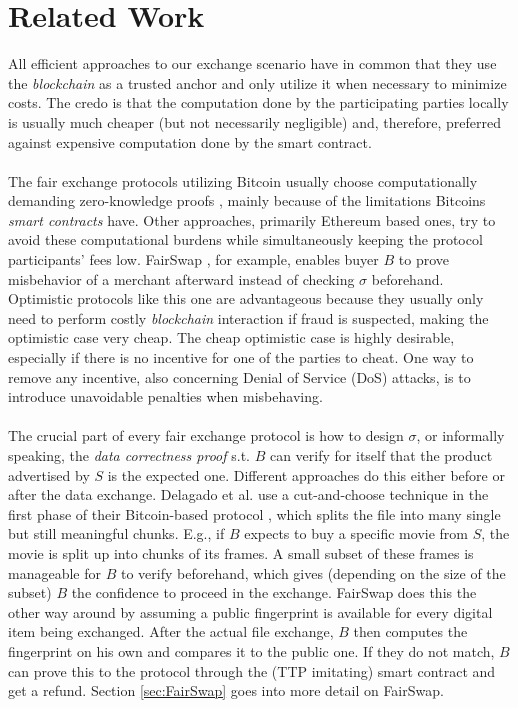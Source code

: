 \documentclass{cacthesis}
\newcounter{protocol}
\begin{document}
        \section{Related Work}
        \label{sec:relatedWork}
        All efficient approaches to our exchange scenario have in common that they use the \textit{blockchain} as a trusted anchor and only utilize it when necessary to minimize costs. The credo is that the computation done by the participating parties locally is usually much cheaper (but not necessarily negligible) and, therefore, preferred against expensive computation done by the smart contract. \\\\
        The fair exchange protocols utilizing Bitcoin usually choose computationally demanding zero-knowledge proofs \cite{zkcp}\cite{DELGADOSEGURA2020832}, mainly because of the limitations Bitcoins \textit{smart contracts} have. Other approaches, primarily Ethereum based ones, try to avoid these computational burdens while simultaneously keeping the protocol participants' fees low. FairSwap \cite{10.1145/3243734.3243857}, for example, enables buyer $B$ to prove misbehavior of a merchant afterward instead of checking $\sigma$ beforehand. Optimistic protocols like this one are advantageous because they usually only need to perform costly \textit{blockchain} interaction if fraud is suspected, making the optimistic case very cheap. The cheap optimistic case is highly desirable, especially if there is no incentive for one of the parties to cheat. One way to remove any incentive, also concerning Denial of Service (DoS) attacks, is to introduce unavoidable penalties when misbehaving. \\\\
        The crucial part of every fair exchange protocol is how to design $\sigma$, or informally speaking, the \textit{data correctness proof} s.t. $B$ can verify for itself that the product advertised by $S$ is the expected one. Different approaches do this either before or after the data exchange. Delagado et al. use a cut-and-choose technique in the first phase of their Bitcoin-based protocol \cite{DELGADOSEGURA2020832}, which splits the file into many single but still meaningful chunks. E.g., if $B$ expects to buy a specific movie from $S$, the movie is split up into chunks of its frames. A small subset of these frames is manageable for $B$ to verify beforehand, which gives (depending on the size of the subset) $B$ the confidence to proceed in the exchange. FairSwap does this the other way around by assuming a public fingerprint is available for every digital item being exchanged. After the actual file exchange, $B$ then computes the fingerprint on his own and compares it to the public one. If they do not match, $B$ can prove this to the protocol through the (TTP imitating) smart contract and get a refund. Section \ref{sec:FairSwap} goes into more detail on FairSwap.
\end{document}
